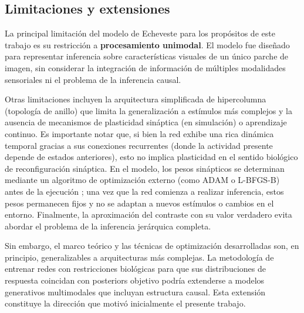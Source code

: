\subsection{Limitaciones y extensiones}
\label{subsec:echeveste_limitaciones}

La principal limitación del modelo de Echeveste para los propósitos de este trabajo es su restricción a \textbf{procesamiento unimodal}. El modelo fue diseñado para representar inferencia sobre características visuales de un único parche de imagen, sin considerar la integración de información de múltiples modalidades sensoriales ni el problema de la inferencia causal.


Otras limitaciones incluyen la arquitectura simplificada de hipercolumna (topología de anillo) que limita la generalización a estímulos más complejos y la ausencia de mecanismos de plasticidad sináptica (en simulación) o aprendizaje continuo. Es importante notar que, si bien la red exhibe una rica dinámica temporal gracias a sus conexiones recurrentes (donde la actividad presente depende de estados anteriores), esto no implica plasticidad en el sentido biológico de reconfiguración sináptica. En el modelo, los pesos sinápticos se determinan mediante un algoritmo de optimización externo (como ADAM o L-BFGS-B) antes de la ejecución ; una vez que la red comienza a realizar inferencia, estos pesos permanecen fijos y no se adaptan a nuevos estímulos o cambios en el entorno. Finalmente, la aproximación del contraste con su valor verdadero evita abordar el problema de la inferencia jerárquica completa.


Sin embargo, el marco teórico y las técnicas de optimización desarrolladas son, en principio, generalizables a arquitecturas más complejas. La metodología de entrenar redes con restricciones biológicas para que sus distribuciones de respuesta coincidan con posteriors objetivo podría extenderse a modelos generativos multimodales que incluyan estructura causal. Esta extensión constituye la dirección que motivó inicialmente el presente trabajo.



